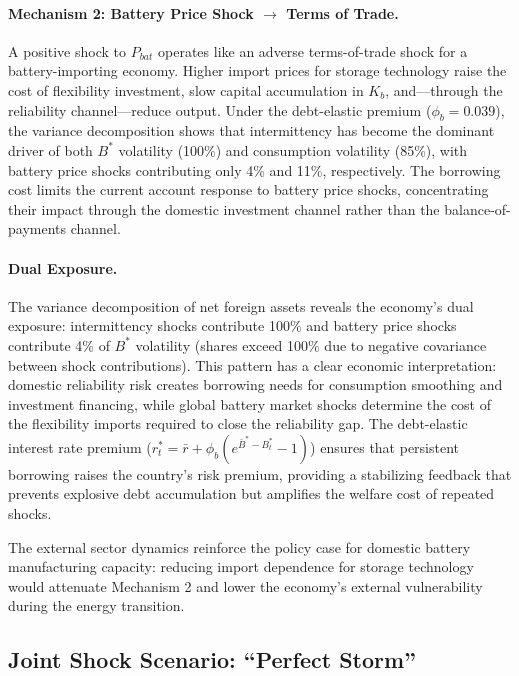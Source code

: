 \documentclass[12pt, a4paper]{article}
\begin{document}
\paragraph{Mechanism 2: Battery Price Shock $\to$ Terms of Trade.} A positive shock to $P_{bat}$ operates like an adverse terms-of-trade shock for a battery-importing economy. Higher import prices for storage technology raise the cost of flexibility investment, slow capital accumulation in $K_b$, and---through the reliability channel---reduce output. Under the debt-elastic premium ($\phi_b = 0.039$), the variance decomposition shows that intermittency has become the dominant driver of both $B^*$ volatility (100\%) and consumption volatility (85\%), with battery price shocks contributing only 4\% and 11\%, respectively. The borrowing cost limits the current account response to battery price shocks, concentrating their impact through the domestic investment channel rather than the balance-of-payments channel.

\paragraph{Dual Exposure.} The variance decomposition of net foreign assets reveals the economy's dual exposure: intermittency shocks contribute 100\% and battery price shocks contribute 4\% of $B^*$ volatility (shares exceed 100\% due to negative covariance between shock contributions). This pattern has a clear economic interpretation: domestic reliability risk creates borrowing needs for consumption smoothing and investment financing, while global battery market shocks determine the cost of the flexibility imports required to close the reliability gap. The debt-elastic interest rate premium ($r^*_t = \bar{r} + \phi_b(e^{\bar{B}^* - B^*_t} - 1)$) ensures that persistent borrowing raises the country's risk premium, providing a stabilizing feedback that prevents explosive debt accumulation but amplifies the welfare cost of repeated shocks.

The external sector dynamics reinforce the policy case for domestic battery manufacturing capacity: reducing import dependence for storage technology would attenuate Mechanism 2 and lower the economy's external vulnerability during the energy transition.

\subsection{Joint Shock Scenario: ``Perfect Storm''} \label{subsec:joint_shock}
\end{document}
